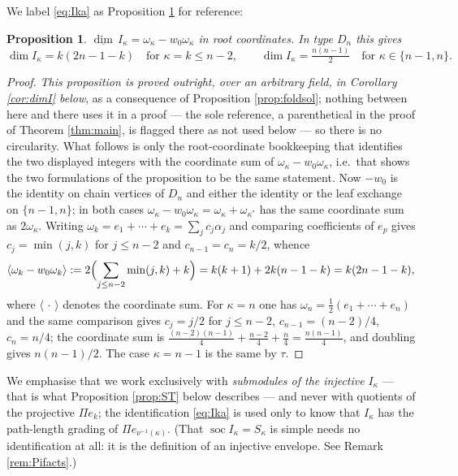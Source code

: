 \documentclass[reqno]{amsart}
\theoremstyle{plain}
\newtheorem{proposition}[theorem]{Proposition}
\theoremstyle{definition}
\DeclareMathOperator{\soc}{soc}
\newcommand{\dimv}{\underline{\dim}\,}
\newcommand{\al}{\alpha}
\newcommand{\om}{\omega}
\newcommand{\ka}{\kappa}
\newcommand{\Pia}{\Pi}
\begin{document}
We label \eqref{eq:Ika} as Proposition \ref{prop:dimI} for reference:

\begin{proposition}\label{prop:dimI}
$\dimv I_\ka=\om_\ka-w_0\om_\ka$ in root coordinates.  In type $D_n$ this
gives
\[
   \dim I_\ka=k(2n-1-k) \quad\text{for } \ka=k\le n-2,
   \qquad
   \dim I_\ka=\tfrac{n(n-1)}{2} \quad\text{for } \ka\in\{n-1,n\}.
\]
\end{proposition}

\begin{proof}
\emph{This proposition is proved outright, over an arbitrary field, in
Corollary \ref{cor:dimI} below}, as a consequence of Proposition
\ref{prop:foldsol}; nothing between here and there uses it in a proof --- the
sole reference, a parenthetical in the proof of Theorem \ref{thm:main}, is
flagged there as not used below --- so there is no circularity.  What follows is only the root-coordinate bookkeeping that
identifies the two displayed integers with the coordinate sum of
$\om_\ka-w_0\om_\ka$, i.e.\ that shows the two formulations of the
proposition to be the same statement.  Now $-w_0$ is
the identity on chain vertices of $D_n$ and either the identity or the leaf
exchange on $\{n-1,n\}$; in both cases $\om_\ka-w_0\om_\ka=\om_\ka+\om_{\ka^*}$
has the same coordinate sum as $2\om_\ka$.  Writing
$\om_k=e_1+\cdots+e_k=\sum_jc_j\al_j$ and comparing coefficients of $e_p$
gives $c_j=\min(j,k)$ for $j\le n-2$ and $c_{n-1}=c_n=k/2$, whence
\[
   \langle\om_k-w_0\om_k\rangle:=2\Bigl(\sum_{j\le n-2}\min(j,k)+k\Bigr)
   =k(k+1)+2k(n-1-k)=k(2n-1-k),
\]
where $\langle\,\cdot\,\rangle$ denotes the coordinate sum.  For $\ka=n$ one has $\om_n=\frac12(e_1+\cdots+e_n)$ and the same comparison
gives $c_j=j/2$ for $j\le n-2$, $c_{n-1}=(n-2)/4$, $c_n=n/4$; the coordinate
sum is $\frac{(n-2)(n-1)}{4}+\frac{n-2}{4}+\frac n4=\frac{n(n-1)}{4}$, and
doubling gives $n(n-1)/2$.  The case $\ka=n-1$ is the same by $\tau$.
\end{proof}

We emphasise that we work exclusively with \emph{submodules of the injective}
$I_\ka$ --- that is what Proposition \ref{prop:ST} below describes --- and
never with quotients of the projective $\Pia e_k$; the identification
\eqref{eq:Ika} is used only to know that $I_\ka$ has the path-length grading
of $\Pia e_{\nu^{-1}(\ka)}$.  (That $\soc I_\ka=S_\ka$ is simple needs no
identification at all: it is the definition of an injective envelope.  See
Remark \ref{rem:Pifacts}.)
\end{document}
